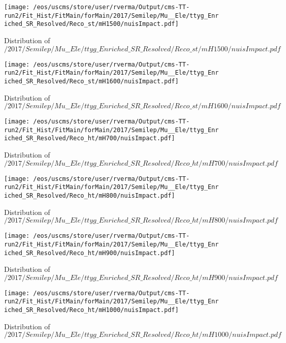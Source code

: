 \begin{figure}
\centering
\texttt{[image: /eos/uscms/store/user/rverma/Output/cms-TT-run2/Fit\_Hist/FitMain/forMain/2017/Semilep/Mu\_\_Ele/ttyg\_Enriched\_SR\_Resolved/Reco\_st/mH1500/nuisImpact.pdf]}
\caption{Distribution of $/2017/Semilep/Mu\_\_Ele/ttyg\_Enriched\_SR\_Resolved/Reco\_st/mH1500/nuisImpact.pdf$}
\end{figure}

\begin{figure}
\centering
\texttt{[image: /eos/uscms/store/user/rverma/Output/cms-TT-run2/Fit\_Hist/FitMain/forMain/2017/Semilep/Mu\_\_Ele/ttyg\_Enriched\_SR\_Resolved/Reco\_st/mH1600/nuisImpact.pdf]}
\caption{Distribution of $/2017/Semilep/Mu\_\_Ele/ttyg\_Enriched\_SR\_Resolved/Reco\_st/mH1600/nuisImpact.pdf$}
\end{figure}

\begin{figure}
\centering
\texttt{[image: /eos/uscms/store/user/rverma/Output/cms-TT-run2/Fit\_Hist/FitMain/forMain/2017/Semilep/Mu\_\_Ele/ttyg\_Enriched\_SR\_Resolved/Reco\_ht/mH700/nuisImpact.pdf]}
\caption{Distribution of $/2017/Semilep/Mu\_\_Ele/ttyg\_Enriched\_SR\_Resolved/Reco\_ht/mH700/nuisImpact.pdf$}
\end{figure}

\begin{figure}
\centering
\texttt{[image: /eos/uscms/store/user/rverma/Output/cms-TT-run2/Fit\_Hist/FitMain/forMain/2017/Semilep/Mu\_\_Ele/ttyg\_Enriched\_SR\_Resolved/Reco\_ht/mH800/nuisImpact.pdf]}
\caption{Distribution of $/2017/Semilep/Mu\_\_Ele/ttyg\_Enriched\_SR\_Resolved/Reco\_ht/mH800/nuisImpact.pdf$}
\end{figure}

\begin{figure}
\centering
\texttt{[image: /eos/uscms/store/user/rverma/Output/cms-TT-run2/Fit\_Hist/FitMain/forMain/2017/Semilep/Mu\_\_Ele/ttyg\_Enriched\_SR\_Resolved/Reco\_ht/mH900/nuisImpact.pdf]}
\caption{Distribution of $/2017/Semilep/Mu\_\_Ele/ttyg\_Enriched\_SR\_Resolved/Reco\_ht/mH900/nuisImpact.pdf$}
\end{figure}

\begin{figure}
\centering
\texttt{[image: /eos/uscms/store/user/rverma/Output/cms-TT-run2/Fit\_Hist/FitMain/forMain/2017/Semilep/Mu\_\_Ele/ttyg\_Enriched\_SR\_Resolved/Reco\_ht/mH1000/nuisImpact.pdf]}
\caption{Distribution of $/2017/Semilep/Mu\_\_Ele/ttyg\_Enriched\_SR\_Resolved/Reco\_ht/mH1000/nuisImpact.pdf$}
\end{figure}

